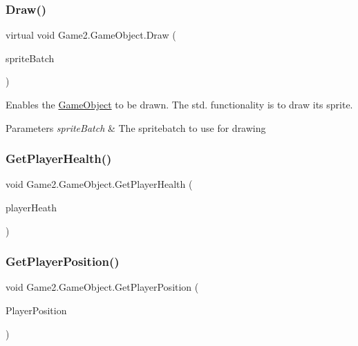 \subsubsection{\texorpdfstring{Draw()}{Draw()}}
{\footnotesize\ttfamily virtual void Game2.\+Game\+Object.\+Draw (\begin{DoxyParamCaption}\item[{Sprite\+Batch}]{sprite\+Batch }\end{DoxyParamCaption})\hspace{0.3cm}{\ttfamily [virtual]}}



Enables the \mbox{\hyperlink{class_game2_1_1_game_object}{Game\+Object}} to be drawn. The std. functionality is to draw its sprite. 


\begin{DoxyParams}{Parameters}
{\em sprite\+Batch} & The spritebatch to use for drawing\\
\hline
\end{DoxyParams}
\mbox{\label{class_game2_1_1_game_object_add937595f4f6918a828af495c08bce3d}} 
\subsubsection{\texorpdfstring{Get\+Player\+Health()}{GetPlayerHealth()}}
{\footnotesize\ttfamily void Game2.\+Game\+Object.\+Get\+Player\+Health (\begin{DoxyParamCaption}\item[{int}]{player\+Heath }\end{DoxyParamCaption})}

\mbox{\label{class_game2_1_1_game_object_a3379bff2fa0d79ae4eeea4f1e9609064}} 
\subsubsection{\texorpdfstring{Get\+Player\+Position()}{GetPlayerPosition()}}
{\footnotesize\ttfamily void Game2.\+Game\+Object.\+Get\+Player\+Position (\begin{DoxyParamCaption}\item[{Vector2}]{Player\+Position }\end{DoxyParamCaption})}



